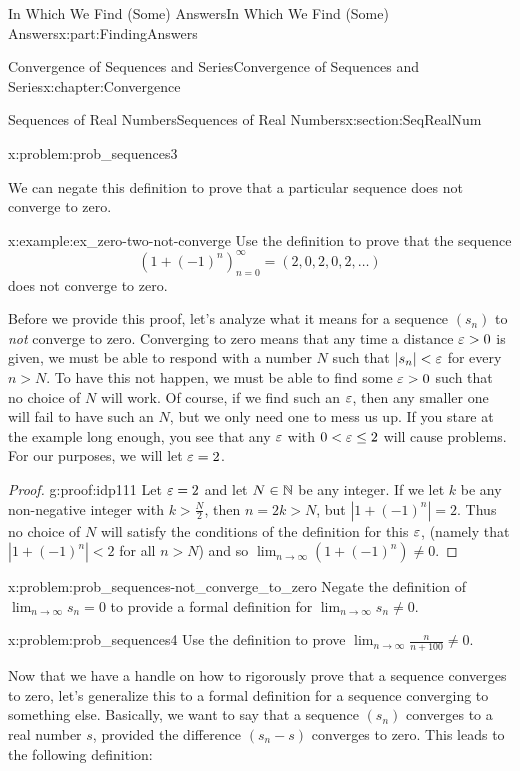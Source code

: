 \begin{partptx}{In Which We Find (Some) Answers}{}{In Which We Find (Some) Answers}{}{}{x:part:FindingAnswers}
\begin{chapterptx}{Convergence of Sequences and Series}{}{Convergence of Sequences and Series}{}{}{x:chapter:Convergence}
\begin{sectionptx}{Sequences of Real Numbers}{}{Sequences of Real Numbers}{}{}{x:section:SeqRealNum}
\begin{problem}{}{x:problem:prob_sequences3}
\begin{enumerate}[font=\bfseries,label=(\alph*),ref=\alph*]
				\end{enumerate}
			\end{problem}
			We can negate this definition to prove that a particular sequence does not converge to zero.%
			\begin{example}{}{x:example:ex_zero-two-not-converge}%
				Use the definition to prove that the sequence%
				\begin{equation*}
					\left(1+(-1)^n\right)_{n=0}^\infty=(2,0,2,0,2,\ldots)
				\end{equation*}
				does not converge to zero.%
			\end{example}
			Before we provide this proof, let's analyze what it means for a sequence \(\left(s_n\right)\) to \emph{not} converge to zero.  Converging to zero means that any time a distance \(\varepsilon>0\) is given, we must be able to respond with a number \(N\) such that \(|s_n|< \varepsilon\) for every \(n>N\).  To have this not happen, we must be able to find some \(\varepsilon>0\) such that no choice of \(N\) will work.  Of course, if we find such an \(\varepsilon\), then any smaller one will fail to have such an \(N\), but we only need one to mess us up.  If you stare at the example long enough, you see that any \(\varepsilon\) with \(0<
			\varepsilon\leq 2\) will cause problems.  For our purposes, we will let \(\varepsilon=2\).%
			\begin{proof}{}{g:proof:idp111}
				Let \(\varepsilon=2\) and let \(N\in\mathbb {N}\) be any integer. If we let \(k\) be any non-negative integer with \(k>\frac{N}{2}\), then \(n=2k>N\), but \(|1+(-1)^n|=2\). Thus no choice of \(N\) will satisfy the conditions of the definition for this \(\varepsilon\), (namely that \(|1+(-1)^n|\lt 2\) for all \(n>N\)) and so \(\lim_{n\rightarrow\infty}\left(1+(-1)^n\right)\neq 0\).%
			\end{proof}
			\begin{problem}{}{x:problem:prob_sequences-not_converge_to_zero}%
				 Negate the definition of \(\lim_{n\rightarrow\infty}s_n=0\) to provide a formal definition for \(\lim_{n\rightarrow\infty}s_n\neq 0\).%
			\end{problem}
			\begin{problem}{}{x:problem:prob_sequences4}%
				Use the definition to prove \(\lim_{n\rightarrow\infty}\frac{n}{n+100}\neq 0\).%
			\end{problem}
			Now that we have a handle on how to rigorously prove that a sequence converges to zero, let's generalize this to a formal definition for a sequence converging to something else. Basically, we want to say that a sequence \(\left(s_n\right)\) converges to a real number \(s\), provided the difference \(\left(s_n-s\right)\) converges to zero. This leads to the following definition:%

\end{sectionptx}
\end{chapterptx}
\end{partptx}
